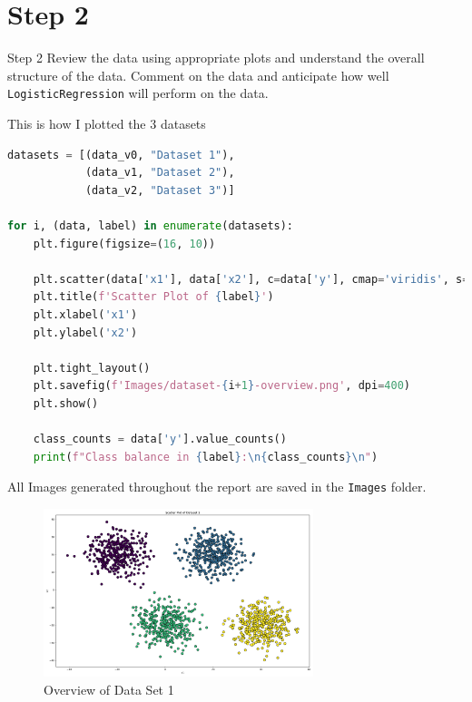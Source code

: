\section*{Step 2}

\begin{custombox}[label={box:Q2}]{Step 2}
	Review the data using appropriate plots and understand the overall structure of the data. Comment on the data and anticipate how well \texttt{LogisticRegression} will perform on the data.
\end{custombox}

\vspace{10mm}

This is how I plotted the 3 datasets

\begin{lstlisting}[language=Python, caption=Plotting the Datasets]
datasets = [(data_v0, "Dataset 1"), 
            (data_v1, "Dataset 2"),
            (data_v2, "Dataset 3")]

for i, (data, label) in enumerate(datasets):
    plt.figure(figsize=(16, 10))
    
    plt.scatter(data['x1'], data['x2'], c=data['y'], cmap='viridis', s=10)
    plt.title(f'Scatter Plot of {label}')
    plt.xlabel('x1')
    plt.ylabel('x2')
    
    plt.tight_layout()
    plt.savefig(f'Images/dataset-{i+1}-overview.png', dpi=400)
    plt.show()
    
    class_counts = data['y'].value_counts()
    print(f"Class balance in {label}:\n{class_counts}\n")
\end{lstlisting}

\begin{remark*}
    All Images generated throughout the report are saved in the \texttt{Images} folder.
\end{remark*}

\begin{figure}[H]
    \centering
    \includegraphics[width=0.7\textwidth]{Images/dataset-1-overview.png}
    \caption{Overview of Data Set 1}
\end{figure}

